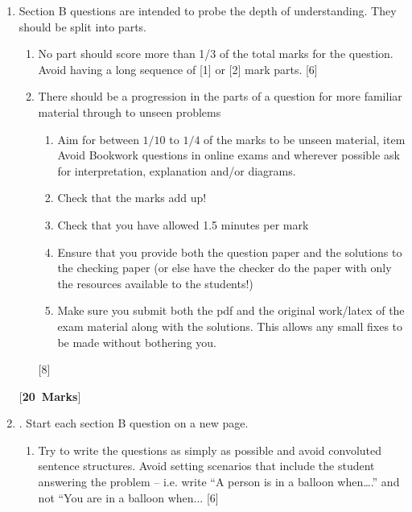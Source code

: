\documentclass[12pt]{article}
\newcommand{\pts}[1]{\hspace*{0.1cm}\hfill[#1]}
\newcommand{\ptsmk}[1]{\phantom{.}\hfill[\textbf{#1~Marks}]}
\begin{document}
	\begin{enumerate}
		\item Section B questions are intended to probe the depth of understanding. They should be split into parts.
		\begin{enumerate}
		\item No part should score more than 1/3 of the total marks for the question. Avoid having a long sequence of [1] or [2] mark parts.
		\pts{6}
		\item There should be a progression in the parts of a question for more familiar material through to unseen problems
		\begin{enumerate}
			\item Aim for between $1/10$ to $1/4$ of the marks to be unseen material,
			item Avoid Bookwork questions in online exams and wherever possible ask for interpretation, explanation and/or diagrams.
			\item Check that the marks add up!
			\item Check that you have allowed 1.5 minutes per mark
			\item Ensure that you provide both the question paper and the solutions to the checking paper (or else have the checker do the paper with only the resources available to the students!)
			\item Make sure you submit both the pdf and the original work/latex of the exam material along with the solutions. This allows any small fixes to be made without bothering you.
		\end{enumerate}
		\pts{8}
		\end{enumerate}
		\ptsmk{20}		
		\newpage
		
		\item. Start each section B question on a new page.
		\begin{enumerate}		
		\item Try to write the questions as simply as possible and avoid convoluted sentence structures. Avoid setting scenarios that include the student answering the problem – i.e. write “A person is in a balloon when….” and not “You are in a balloon when...
		\pts{6}
		

\end{enumerate}
\end{enumerate}
\end{document}
